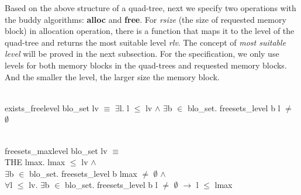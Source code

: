 Based on the above structure of a quad-tree, next we specify two operations with the buddy algorithms: \textbf{alloc} and \textbf{free}. For \emph{rsize} (the size of requested memory block) in allocation operation, there is a function that maps it to the level of the quad-tree and returns the most suitable level \emph{rlv}. The concept of \emph{most suitable level} will be proved in the next subsection. For the specification, we only use levels for both memory blocks in the quad-trees and requested memory blocks. And the smaller the level, the larger size the memory block.

\begin{definition}  \\
	exists\_freelevel blo\_set lv $\equiv$ $\exists$l. l $\leq$ lv $\wedge$ $\exists$b $\in$ blo\_set. freesets\_level b l $\ne$ $\emptyset$
\end{definition}

\begin{definition}  \\
	freesets\_maxlevel blo\_set lv $\equiv$ \\
	\phantom{x} \hspace{10pt} THE lmax. lmax $\leq$ lv $\wedge$ \\
	\phantom{x} \hspace{60pt} $\exists$b $\in$ blo\_set. freesets\_level b lmax $\neq$ $\emptyset$ $\wedge$ \\
	\phantom{x} \hspace{60pt} $\forall$l $\leq$ lv. $\exists$b $\in$ blo\_set. freesets\_level b l $\ne$ $\emptyset$ $\longrightarrow$ l $\leq$ lmax
\end{definition}

